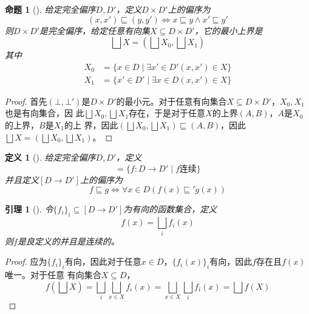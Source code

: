 \documentclass{jams-l}
\newtheorem{proposition}[theorem]{命题}
\newtheorem{lemma}[theorem]{引理}
\newtheorem{definition}[theorem]{定义}
\begin{document}
\begin{proposition}[]
给定完全偏序\(D,D'\)，定义\(D\times D'\)上的偏序为
\begin{equation*}
(x,x')\sqsubseteq(y,y')\Leftrightarrow x\sqsubseteq y\wedge x'\sqsubseteq y'
\end{equation*}
则\(D\times D'\)是完全偏序，给定任意有向集\(X\subseteq D\times D'\)，它的最小上界是
\begin{equation*}
\bigsqcup X=(\bigsqcup X_0,\bigsqcup X_1)
\end{equation*}
其中
\begin{align*}
X_0&=\{x\in D\mid\exists x'\in  D'(x,x')\in X\}\\
X_1&=\{x'\in D'\mid\exists x\in D(x,x')\in X\}
\end{align*}
\end{proposition}

\begin{proof}
首先\((\bot,\bot')\)是\(D\times D'\)的最小元。对于任意有向集合\(X\subseteq D\times D'\)，\(X_0,X_1\)也是有向集合，因
此\(\bigsqcup X_0,\bigsqcup X_1\)存在，于是对于任意\(X\)的上界\((A,B)\)，\(A\)是\(X_0\)的上界，\(B\)是\(X_1\)的上
界，因此\((\bigsqcup X_0,\bigsqcup X_1)\sqsubseteq(A,B)\)，因此\(\bigsqcup X=(\bigsqcup X_0,\bigsqcup X_1)\)。
\end{proof}


\begin{definition}[]
给定完全偏序\(D,D'\)，定义
\begin{equation*}
[D\to D']=\{f:D\to D'\mid f\text{连续}\}
\end{equation*}
并且定义\([D\to D']\)上的偏序为
\begin{equation*}
f\sqsubseteq g\Leftrightarrow\forall x\in D(f(x)\sqsubseteq'g(x))
\end{equation*}
\end{definition}

\begin{lemma}[]
\label{1.2.10}
令\(\{f_i\}_i\subseteq[D\to D']\)为有向的函数集合，定义
\begin{equation*}
f(x)=\bigsqcup_if_i(x)
\end{equation*}
则\(f\)是良定义的并且是连续的。
\end{lemma}

\begin{proof}
应为\(\{f_i\}_i\)有向，因此对于任意\(x\in D\)，\(\{f_i(x)\}_i\)有向，因此\(f\)存在且\(f(x)\)唯一。对于任意
有向集合\(X\subseteq D\)，
\begin{equation*}
f(\bigsqcup X)=\bigsqcup_i\bigsqcup_{x\in X}f_i(x)=\bigsqcup_{x\in X}\bigsqcup_if_i(x)=\bigsqcup f(X)
\end{equation*}
\end{proof}
\end{document}
